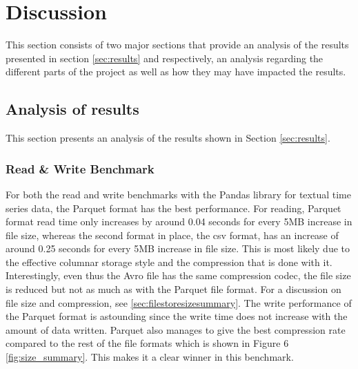\clearpage
\section{Discussion}
\label{sec:discussion}
This section consists of two major sections that provide an analysis of the results presented in section \ref{sec:results} and respectively, an analysis regarding the different parts of the project as well as how they may have impacted the results.

\subsection{Analysis of results}
This section presents an analysis of the results shown in Section \ref{sec:results}.
\subsubsection{Read \& Write Benchmark}
For both the read and write benchmarks with the Pandas library for textual time series data, the Parquet format has the best performance. For reading, Parquet format read time only increases by around 0.04 seconds for every 5MB increase in file size, whereas the second format in place, the csv format, has an increase of around 0.25 seconds for every 5MB increase in file size. This is most likely due to the effective columnar storage style and the compression that is done with it. Interestingly, even thus the Avro file has the same compression codec, the file size is reduced but not as much as with the Parquet file format. For a discussion on file size and compression, see \ref{sec:filestoresizesummary}. The write performance of the Parquet format is astounding since the write time does not increase with the amount of data written. Parquet also manages to give the best compression rate compared to the rest of the file formats which is shown in Figure 6 \ref{fig:size_summary}. This makes it a clear winner in this benchmark. 


